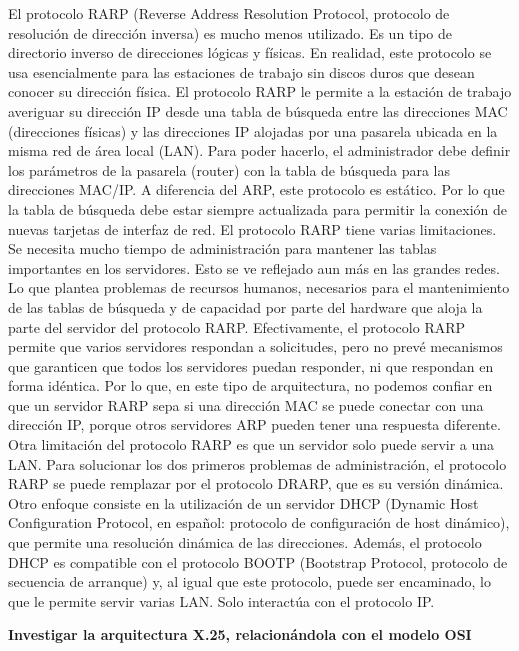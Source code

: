 \documentclass[a4paper,12pt]{article}
\begin{document}
\begin{itemize}
 El protocolo RARP (Reverse Address Resolution Protocol, protocolo de resolución de dirección inversa) es mucho menos utilizado. Es un tipo de directorio
 inverso de direcciones lógicas y físicas. En realidad, este protocolo se usa esencialmente para las estaciones de trabajo sin discos duros que desean conocer
 su dirección física.
 El protocolo RARP le permite a la estación de trabajo averiguar su dirección IP desde una tabla de búsqueda entre las direcciones MAC (direcciones físicas) y
 las direcciones IP alojadas por una pasarela ubicada en la misma red de área local (LAN). Para poder hacerlo, el administrador debe definir los parámetros de la pasarela
 (router) con la tabla de búsqueda para las direcciones MAC/IP. A diferencia del ARP, este protocolo es estático. Por lo que la tabla de búsqueda debe estar
 siempre actualizada para permitir la conexión de nuevas tarjetas de interfaz de red. 
 El protocolo RARP tiene varias limitaciones. Se necesita mucho tiempo de administración para mantener las tablas importantes en los servidores. Esto se ve reflejado
 aun más en las grandes redes. Lo que plantea problemas de recursos humanos, necesarios para el mantenimiento de las tablas de búsqueda y de capacidad por parte del
 hardware que aloja la parte del servidor del protocolo RARP. Efectivamente, el protocolo RARP permite que varios servidores respondan a solicitudes, pero no prevé
 mecanismos que garanticen que todos los servidores puedan responder, ni que respondan en forma idéntica. Por lo que, en este tipo de arquitectura, no podemos confiar
 en que un servidor RARP sepa si una dirección MAC se puede conectar con una dirección IP, porque otros servidores ARP pueden tener una respuesta diferente.
 Otra limitación del protocolo RARP es que un servidor solo puede servir a una LAN. 
 Para solucionar los dos primeros problemas de administración, el protocolo RARP se puede remplazar por el protocolo DRARP, que es su versión dinámica. 
 Otro enfoque consiste en la utilización de un servidor DHCP (Dynamic Host Configuration Protocol, en español: protocolo de configuración de host dinámico), 
 que permite una resolución dinámica de las direcciones. Además, el protocolo DHCP es compatible con el protocolo BOOTP (Bootstrap Protocol, protocolo de secuencia 
 de arranque) y, al igual que este protocolo, puede ser encaminado, lo que le permite servir varias LAN. Solo interactúa con el protocolo IP.
\end{itemize}

\begin{large}
 \textbf{Investigar la arquitectura X.25, relacionándola con el modelo OSI}
\end{large}
\end{document}
